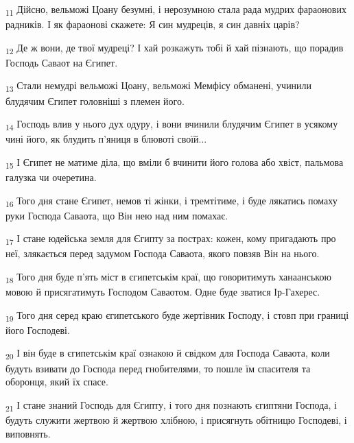 \begin{tcolorbox}
\textsubscript{11} Дійсно, вельможі Цоану безумні, і нерозумною стала рада мудрих фараонових радників. І як фараонові скажете: Я син мудреців, я син давніх царів?
\end{tcolorbox}
\begin{tcolorbox}
\textsubscript{12} Де ж вони, де твої мудреці? І хай розкажуть тобі й хай пізнають, що порадив Господь Саваот на Єгипет.
\end{tcolorbox}
\begin{tcolorbox}
\textsubscript{13} Стали немудрі вельможі Цоану, вельможі Мемфісу обманені, учинили блудячим Єгипет головніші з племен його.
\end{tcolorbox}
\begin{tcolorbox}
\textsubscript{14} Господь влив у нього дух одуру, і вони вчинили блудячим Єгипет в усякому чині його, як блудить п'яниця в блювоті своїй...
\end{tcolorbox}
\begin{tcolorbox}
\textsubscript{15} І Єгипет не матиме діла, що вміли б вчинити його голова або хвіст, пальмова галузка чи очеретина.
\end{tcolorbox}
\begin{tcolorbox}
\textsubscript{16} Того дня стане Єгипет, немов ті жінки, і тремтітиме, і буде лякатись помаху руки Господа Саваота, що Він нею над ним помахає.
\end{tcolorbox}
\begin{tcolorbox}
\textsubscript{17} І стане юдейська земля для Єгипту за пострах: кожен, кому пригадають про неї, злякається перед задумом Господа Саваота, якого повзяв Він на нього.
\end{tcolorbox}
\begin{tcolorbox}
\textsubscript{18} Того дня буде п'ять міст в єгипетськім краї, що говоритимуть ханаанською мовою й присягатимуть Господом Саваотом. Одне буде зватися Ір-Гахерес.
\end{tcolorbox}
\begin{tcolorbox}
\textsubscript{19} Того дня серед краю єгипетського буде жертівник Господу, і стовп при границі його Господеві.
\end{tcolorbox}
\begin{tcolorbox}
\textsubscript{20} І він буде в єгипетськім краї ознакою й свідком для Господа Саваота, коли будуть взивати до Господа перед гнобителями, то пошле їм спасителя та оборонця, який їх спасе.
\end{tcolorbox}
\begin{tcolorbox}
\textsubscript{21} І стане знаний Господь для Єгипту, і того дня познають єгиптяни Господа, і будуть служити жертвою й жертвою хлібною, і присягнуть обітницю Господеві, і виповнять.
\end{tcolorbox}
